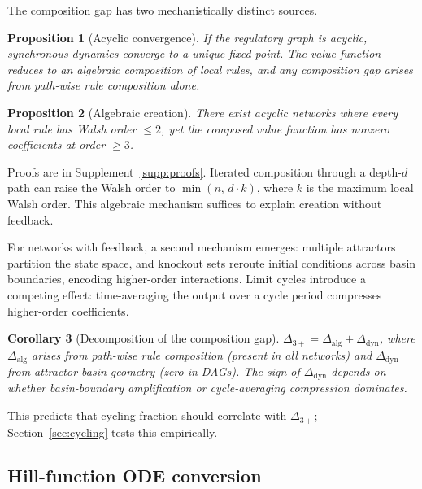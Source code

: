\documentclass[10pt]{article}
\newtheorem{proposition}{Proposition}
\newtheorem{corollary}[proposition]{Corollary}
\begin{document}
The composition gap has two mechanistically distinct sources.

\begin{proposition}[Acyclic convergence]
\label{prop:dag}
If the regulatory graph is acyclic, synchronous dynamics converge to
a unique fixed point. The value function reduces to an algebraic
composition of local rules, and any composition gap arises from
path-wise rule composition alone.
\end{proposition}

\begin{proposition}[Algebraic creation]
\label{prop:creation}
There exist acyclic networks where every local rule has Walsh order
$\leq 2$, yet the composed value function has nonzero coefficients at
order $\geq 3$.
\end{proposition}

Proofs are in Supplement~\ref{supp:proofs}. Iterated composition
through a depth-$d$ path can raise the Walsh order to
$\min(n,\, d \cdot k)$, where $k$ is the maximum local Walsh order.
This algebraic mechanism suffices to explain creation without
feedback.

For networks with feedback, a second mechanism emerges: multiple
attractors partition the state space, and knockout sets reroute
initial conditions across basin boundaries, encoding higher-order
interactions. Limit cycles introduce a competing effect:
time-averaging the output over a cycle period compresses higher-order
coefficients.

\begin{corollary}[Decomposition of the composition gap]
\label{cor:decomposition}
$\Delta_{3+} = \Delta_{\mathrm{alg}} + \Delta_{\mathrm{dyn}}$,
where $\Delta_{\mathrm{alg}}$ arises from path-wise rule composition
(present in all networks) and $\Delta_{\mathrm{dyn}}$ from attractor
basin geometry (zero in DAGs). The sign of
$\Delta_{\mathrm{dyn}}$ depends on whether basin-boundary
amplification or cycle-averaging compression dominates.
\end{corollary}

This predicts that cycling fraction should correlate with
$\Delta_{3+}$; Section~\ref{sec:cycling} tests this empirically.


\subsection{Hill-function ODE conversion}
\label{sec:ode-method}
\end{document}
